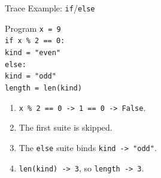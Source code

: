 \documentclass[aspectratio=169,10pt]{beamer}
\begin{document}
\begin{frame}{Trace Example: \texttt{if}/\texttt{else}}
  \begin{block}{Program}
    \texttt{x = 9}\\
    \texttt{if x \% 2 == 0:}\\
    \hspace*{0.20in}\texttt{kind = "even"}\\
    \texttt{else:}\\
    \hspace*{0.20in}\texttt{kind = "odd"}\\
    \texttt{length = len(kind)}
  \end{block}

  \begin{enumerate}
    \item \texttt{x \% 2 == 0 -> 1 == 0 -> False}.
    \item The first suite is skipped.
    \item The \texttt{else} suite binds \texttt{kind -> "odd"}.
    \item \texttt{len(kind) -> 3}, so \texttt{length -> 3}.
  \end{enumerate}
\end{frame}
\end{document}
